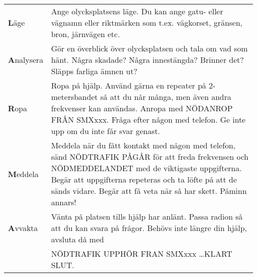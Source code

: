 \begin{tabular}{lp{9cm}}
	\textbf{L}äge &
	Ange olycksplatsens läge. Du kan ange gatu- eller vägnamn eller riktmärken som
	t.ex. vägkorset, gränsen, bron, järnvägen etc.
	\\
	\textbf{A}nalysera
	&
	Gör en överblick över
	olycksplatsen och tala om vad som hänt.  Några skadade? Några innestängda?
	Brinner det? Släpps farliga ämnen ut?
	\\
	\textbf{R}opa &
	Ropa på hjälp. Använd gärna en repeater på 2-metersbandet så att du når många,
	men även andra frekvenser kan användas.  Anropa med NÖDANROP FRÅN SMXxxx. Fråga
	efter någon med telefon. Ge inte upp om du inte får svar genast.
	\\
	\textbf{M}eddela &
	Meddela när du fått kontakt med någon med telefon, sänd NÖDTRAFIK PÅGÅR för att
	freda frekvensen och NÖDMEDDELANDET med de viktigaste uppgifterna. Begär att
	uppgifterna repeteras och ta löfte på att de sänds vidare. Begär att få veta när
	så har skett. Påminn annars!
	\\
	\textbf{A}vvakta &
	Vänta på platsen tills hjälp har anlänt. Passa radion så att du kan svara på
	frågor. Behövs inte längre din hjälp, avsluta då med\\
	& NÖDTRAFIK UPPHÖR FRAN SMXxxx \dots KLART SLUT.
\end{tabular}
